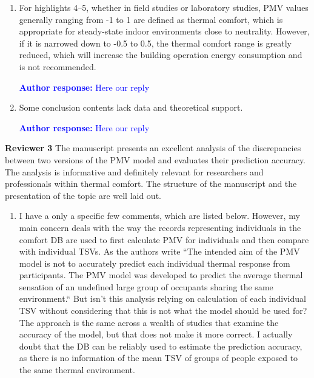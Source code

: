 \documentclass[a4paper, 10pt]{letter}
\newcommand{\response}[1]{\textcolor{blue}{\textbf{Author response:} #1}}
\begin{document}
\begin{letter}
\begin{enumerate}
            \response{Here our reply}

            \item For highlights 4--5, whether in field studies or laboratory studies, PMV values generally ranging from -1 to 1 are defined as thermal comfort, which is appropriate for steady-state indoor environments close to neutrality.
            However, if it is narrowed down to -0.5 to 0.5, the thermal comfort range is greatly reduced, which will increase the building operation energy consumption and is not recommended.

            \response{Here our reply}

            \item Some conclusion contents lack data and theoretical support.

            \response{Here our reply}

        \end{enumerate}

        \clearpage

        \textbf{Reviewer 3}
        The manuscript presents an excellent analysis of the discrepancies between two versions of the PMV model and evaluates their prediction accuracy.
        The analysis is informative and definitely relevant for researchers and professionals within thermal comfort.
        The structure of the manuscript and the presentation of the topic are well laid out.

        \begin{enumerate}
            \item I have a only a specific few comments, which are listed below.
            However, my main concern deals with the way the records representing individuals in the comfort DB are used to first calculate PMV for individuals and then compare with individual TSVs.
            As the authors write ``The intended aim of the PMV model is not to accurately predict each individual thermal response from participants.
            The PMV model was developed to predict the average thermal sensation of an undefined large group of occupants sharing the same environment.`` But isn't this analysis relying on calculation of each individual TSV without considering that this is not what the model should be used for?
            The approach is the same across a wealth of studies that examine the accuracy of the model, but that does not make it more correct.
            I actually doubt that the DB can be reliably used to estimate the prediction accuracy, as there is no information of the mean TSV of groups of people exposed to the same thermal environment.


\end{enumerate}
\end{letter}
\end{document}
